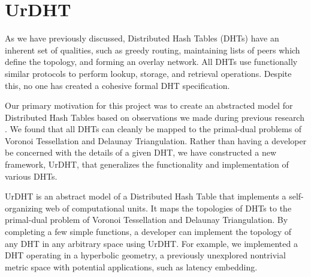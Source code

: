 \chapter{UrDHT}
\label{chapter:urdht}
As we have previously discussed, Distributed Hash Tables (DHTs) have an inherent set of qualities, such as greedy routing, maintaining lists of peers which define the topology, and forming an overlay network.
All DHTs use functionally similar protocols to perform lookup, storage, and retrieval operations.
Despite this, no one has created a cohesive formal DHT specification.

Our primary motivation for this project was to create an abstracted model for Distributed Hash Tables based on observations we made during previous research \cite{dgvh}.
We found that all DHTs can cleanly be mapped to the primal-dual problems of Voronoi Tessellation and Delaunay Triangulation.
Rather than having a developer be concerned with the details of a given DHT, we have constructed a new framework, UrDHT, that generalizes the functionality and implementation of various DHTs.

UrDHT is an abstract model of a Distributed Hash Table that implements a self-organizing web of computational units.
It maps the topologies of DHTs to the primal-dual problem of Voronoi Tessellation and Delaunay Triangulation.
By completing a few simple functions, a developer can implement the topology of any DHT in any arbitrary space using UrDHT.
For example, we implemented a DHT operating in a hyperbolic geometry, a previously unexplored nontrivial metric space with potential applications, such as latency embedding.


	




